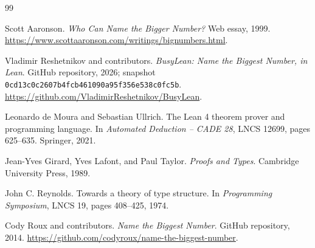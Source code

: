 \documentclass[11pt]{article}
\theoremstyle{definition}
\theoremstyle{remark}
\begin{document}
\begingroup
\footnotesize
\begin{thebibliography}{99}
\setlength{\itemsep}{0pt}

Scott Aaronson.
\newblock \emph{Who Can Name the Bigger Number?}
\newblock Web essay, 1999.
\newblock \url{https://www.scottaaronson.com/writings/bignumbers.html}.

Vladimir Reshetnikov and contributors.
\newblock \emph{BusyLean: Name the Biggest Number, in Lean}.
\newblock GitHub repository, 2026; snapshot
\texttt{0cd13c0c2607b4fcb461090a95f356e538c0fc5b}.
\newblock \url{https://github.com/VladimirReshetnikov/BusyLean}.

Leonardo de Moura and Sebastian Ullrich.
\newblock The Lean 4 theorem prover and programming language.
\newblock In \emph{Automated Deduction -- CADE 28}, LNCS 12699,
pages 625--635. Springer, 2021.

Jean-Yves Girard, Yves Lafont, and Paul Taylor.
\newblock \emph{Proofs and Types}.
\newblock Cambridge University Press, 1989.

John C. Reynolds.
\newblock Towards a theory of type structure.
\newblock In \emph{Programming Symposium}, LNCS 19, pages 408--425, 1974.

Cody Roux and contributors.
\newblock \emph{Name the Biggest Number}.
\newblock GitHub repository, 2014.
\newblock \url{https://github.com/codyroux/name-the-biggest-number}.

\end{thebibliography}
\endgroup
\end{document}
